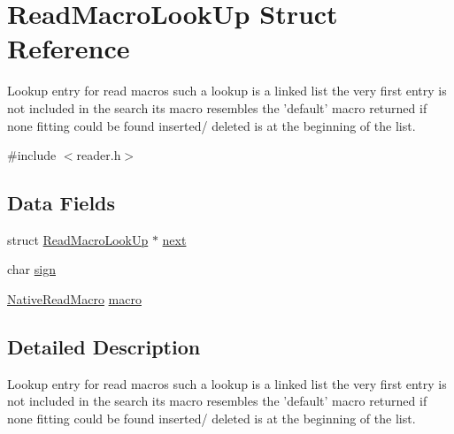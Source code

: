 \hypertarget{structReadMacroLookUp}{\section{Read\+Macro\+Look\+Up Struct Reference}
\label{structReadMacroLookUp}
}


Lookup entry for read macros such a lookup is a linked list the very first entry is not included in the search its macro resembles the 'default' macro returned if none fitting could be found inserted/ deleted is at the beginning of the list.  




{\ttfamily \#include $<$reader.\+h$>$}

\subsection*{Data Fields}
\begin{DoxyCompactItemize}
\item 
struct \hyperlink{structReadMacroLookUp}{Read\+Macro\+Look\+Up} $\ast$ \hyperlink{structReadMacroLookUp_a625eb8099554d48e15723ee9fe5edf83}{next}
\item 
char \hyperlink{structReadMacroLookUp_a42c38e43d913109ab5c342821518b3eb}{sign}
\item 
\hyperlink{reader_8h_a7424d77c135ab9f31c4317db6ac22a7d}{Native\+Read\+Macro} \hyperlink{structReadMacroLookUp_a92abc2fcc76ad77e9ed0fb234a17ec4b}{macro}
\end{DoxyCompactItemize}


\subsection{Detailed Description}
Lookup entry for read macros such a lookup is a linked list the very first entry is not included in the search its macro resembles the 'default' macro returned if none fitting could be found inserted/ deleted is at the beginning of the list. 


